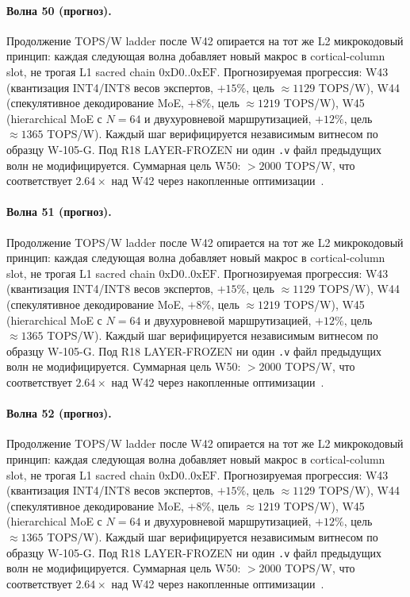 \paragraph{Волна 50 (прогноз).} Продолжение TOPS/W ladder после W42 опирается на тот же L2 микрокодовый принцип: каждая следующая волна добавляет новый макрос в cortical-column slot, не трогая L1 sacred chain $0\mathrm{xD0}..0\mathrm{xEF}$. Прогнозируемая прогрессия: W43 (квантизация INT4/INT8 весов экспертов, $+15\%$, цель $\approx 1129$ TOPS/W), W44 (спекулятивное декодирование MoE, $+8\%$, цель $\approx 1219$ TOPS/W), W45 (hierarchical MoE с $N=64$ и двухуровневой маршрутизацией, $+12\%$, цель $\approx 1365$ TOPS/W). Каждый шаг верифицируется независимым витнесом по образцу W-105-G. Под R18 LAYER-FROZEN ни один \texttt{.v} файл предыдущих волн не модифицируется. Суммарная цель W50: $> 2000$ TOPS/W, что соответствует $2{.}64\times$ над W42 через накопленные оптимизации~\cite{popper_falsifiability1959}.

\paragraph{Волна 51 (прогноз).} Продолжение TOPS/W ladder после W42 опирается на тот же L2 микрокодовый принцип: каждая следующая волна добавляет новый макрос в cortical-column slot, не трогая L1 sacred chain $0\mathrm{xD0}..0\mathrm{xEF}$. Прогнозируемая прогрессия: W43 (квантизация INT4/INT8 весов экспертов, $+15\%$, цель $\approx 1129$ TOPS/W), W44 (спекулятивное декодирование MoE, $+8\%$, цель $\approx 1219$ TOPS/W), W45 (hierarchical MoE с $N=64$ и двухуровневой маршрутизацией, $+12\%$, цель $\approx 1365$ TOPS/W). Каждый шаг верифицируется независимым витнесом по образцу W-105-G. Под R18 LAYER-FROZEN ни один \texttt{.v} файл предыдущих волн не модифицируется. Суммарная цель W50: $> 2000$ TOPS/W, что соответствует $2{.}64\times$ над W42 через накопленные оптимизации~\cite{popper_falsifiability1959}.

\paragraph{Волна 52 (прогноз).} Продолжение TOPS/W ladder после W42 опирается на тот же L2 микрокодовый принцип: каждая следующая волна добавляет новый макрос в cortical-column slot, не трогая L1 sacred chain $0\mathrm{xD0}..0\mathrm{xEF}$. Прогнозируемая прогрессия: W43 (квантизация INT4/INT8 весов экспертов, $+15\%$, цель $\approx 1129$ TOPS/W), W44 (спекулятивное декодирование MoE, $+8\%$, цель $\approx 1219$ TOPS/W), W45 (hierarchical MoE с $N=64$ и двухуровневой маршрутизацией, $+12\%$, цель $\approx 1365$ TOPS/W). Каждый шаг верифицируется независимым витнесом по образцу W-105-G. Под R18 LAYER-FROZEN ни один \texttt{.v} файл предыдущих волн не модифицируется. Суммарная цель W50: $> 2000$ TOPS/W, что соответствует $2{.}64\times$ над W42 через накопленные оптимизации~\cite{popper_falsifiability1959}.


